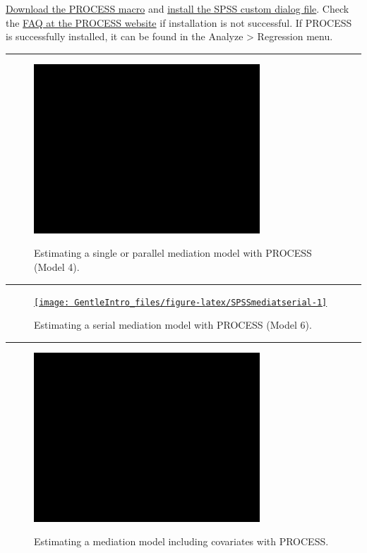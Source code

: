 \documentclass[a4paper]{book}
\theoremstyle{definition}
\theoremstyle{definition}
\theoremstyle{definition}
\theoremstyle{remark}
\begin{document}
\href{http://processmacro.org/download.html}{Download the PROCESS macro}
and
\href{http://www.processmacro.org/uploads/3/4/8/5/34858384/dialoginstall.pdf}{install
the SPSS custom dialog file}. Check the
\href{http://processmacro.org/faq.html}{FAQ at the PROCESS website} if
installation is not successful. If PROCESS is successfully installed, it
can be found in the Analyze \textgreater{} Regression menu.

\begin{center}\rule{0.5\linewidth}{\linethickness}\end{center}

\begin{figure}[H]
\href{https://www.youtube.com/embed/m6S7hCnyjuY}{\includegraphics[width=320px]{GentleIntro_files/figure-latex/SPSSmediatpar-1} }\caption{Estimating a single or parallel mediation model with
PROCESS (Model 4).}\label{fig:SPSSmediatpar}
\end{figure}

\begin{center}\rule{0.5\linewidth}{\linethickness}\end{center}

\begin{figure}[H]
\href{https://www.youtube.com/embed/ryUzyM4eWVc}{\texttt{[image: GentleIntro\_files/figure-latex/SPSSmediatserial-1]} }\caption{Estimating a serial mediation model with PROCESS
(Model 6).}\label{fig:SPSSmediatserial}
\end{figure}

\begin{center}\rule{0.5\linewidth}{\linethickness}\end{center}

\begin{figure}[H]
\href{https://www.youtube.com/embed/oXnpoTKGmB8}{\includegraphics[width=320px]{GentleIntro_files/figure-latex/SPSSmediatcov-1} }\caption{Estimating a mediation model including covariates
with PROCESS.}\label{fig:SPSSmediatcov}
\end{figure}
\end{document}
